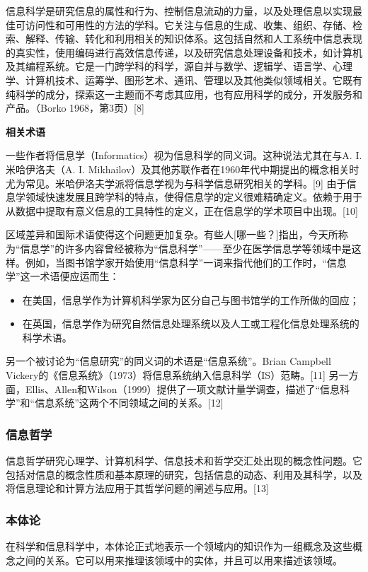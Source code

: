 信息科学是研究信息的属性和行为、控制信息流动的力量，以及处理信息以实现最佳可访问性和可用性的方法的学科。它关注与信息的生成、收集、组织、存储、检索、解释、传输、转化和利用相关的知识体系。这包括自然和人工系统中信息表现的真实性，使用编码进行高效信息传递，以及研究信息处理设备和技术，如计算机及其编程系统。它是一门跨学科的科学，源自并与数学、逻辑学、语言学、心理学、计算机技术、运筹学、图形艺术、通讯、管理以及其他类似领域相关。它既有纯科学的成分，探索这一主题而不考虑其应用，也有应用科学的成分，开发服务和产品。（Borko 1968，第3页）[8]

\textbf{相关术语}

一些作者将信息学（Informatics）视为信息科学的同义词。这种说法尤其在与A. I. 米哈伊洛夫（A. I. Mikhailov）及其他苏联作者在1960年代中期提出的概念相关时尤为常见。米哈伊洛夫学派将信息学视为与科学信息研究相关的学科。[9] 由于信息学领域快速发展且跨学科的特点，使得信息学的定义很难精确定义。依赖于用于从数据中提取有意义信息的工具特性的定义，正在信息学的学术项目中出现。[10]

区域差异和国际术语使得这个问题更加复杂。有些人[哪一些？]指出，今天所称为“信息学”的许多内容曾经被称为“信息科学”——至少在医学信息学等领域中是这样。例如，当图书馆学家开始使用“信息科学”一词来指代他们的工作时，“信息学”这一术语便应运而生：
\begin{itemize}
\item 在美国，信息学作为计算机科学家为区分自己与图书馆学的工作所做的回应；
\item 在英国，信息学作为研究自然信息处理系统以及人工或工程化信息处理系统的科学术语。
\end{itemize}
另一个被讨论为“信息研究”的同义词的术语是“信息系统”。Brian Campbell Vickery的《信息系统》（1973）将信息系统纳入信息科学（IS）范畴。[11] 另一方面，Ellis、Allen和Wilson（1999）提供了一项文献计量学调查，描述了“信息科学”和“信息系统”这两个不同领域之间的关系。[12]
\subsubsection{信息哲学}   
信息哲学研究心理学、计算机科学、信息技术和哲学交汇处出现的概念性问题。它包括对信息的概念性质和基本原理的研究，包括信息的动态、利用及其科学，以及将信息理论和计算方法应用于其哲学问题的阐述与应用。[13]
\subsubsection{本体论}   
在科学和信息科学中，本体论正式地表示一个领域内的知识作为一组概念及这些概念之间的关系。它可以用来推理该领域中的实体，并且可以用来描述该领域。

